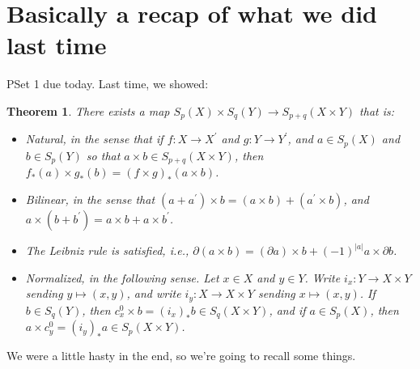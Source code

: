 \documentclass{amsart}
\theoremstyle{theorem}
\newtheorem{theorem}{Theorem}[section]
\theoremstyle{definition}
\begin{document}
\section{Basically a recap of what we did last time}
PSet 1 due today. Last time, we showed:
\begin{theorem}
There exists a map $S_p(X)\times S_q(Y)\to S_{p+q}(X\times Y)$ that is:
	\begin{itemize}
	\item Natural, in the sense that if $f:X\to X^\prime$ and $g:Y\to Y^\prime$, and $a\in S_p(X)$ and $b\in S_p(Y)$ so that $a\times b\in S_{p+q}(X\times Y)$, then $f_\ast(a)\times g_\ast(b)=(f\times g)_\ast(a\times b)$.
	\item Bilinear, in the sense that $(a+a^\prime)\times b=(a\times b)+(a^\prime\times b)$, and $a\times (b+b^\prime)=a\times b+a\times b^\prime$.
	\item The Leibniz rule is satisfied, i.e., $\partial(a\times b)=(\partial a)\times b + (-1)^{|a|}a\times \partial b$.
	\item Normalized, in the following sense. Let $x\in X$ and $y\in Y$. Write $i_x:Y\to X\times Y$ sending $y\mapsto (x,y)$, and write $i_y:X\to X\times Y$ sending $x\mapsto (x,y)$. If $b\in S_q(Y)$, then $c^0_x\times b=(i_x)_\ast b\in S_q(X\times Y)$, and if $a\in S_p(X)$, then $a\times c^0_y=(i_y)_\ast a\in S_p(X\times Y)$.
	\end{itemize}
\end{theorem}
We were a little hasty in the end, so we're going to recall some things.
\end{document}
